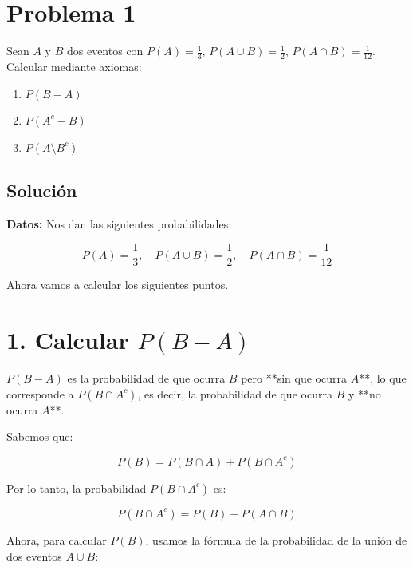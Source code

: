 \documentclass[titlepage]{article} %
\begin{document}
    \restoregeometry %

    \setcounter{page}{1}  %

    \newpage

    \Large

    \section*{\Large Problema 1}

\Large Sean $A$ y $B$ dos eventos con $P(A) = \frac{1}{3}$, $P(A \cup B) = \frac{1}{2}$, $P(A \cap B) = \frac{1}{12}$. Calcular mediante axiomas: 

\begin{enumerate}
    \item $P(B - A)$
    \item $P(A^{c} - B)$
    \item $P(A \setminus B^{c})$
\end{enumerate}

\subsection*{\Large Solución}

\Large
\textbf{Datos:}  
Nos dan las siguientes probabilidades:

\[
P(A) = \frac{1}{3}, \quad P(A \cup B) = \frac{1}{2}, \quad P(A \cap B) = \frac{1}{12}
\]

Ahora vamos a calcular los siguientes puntos.

\section*{1. Calcular \( P(B - A) \)}

\( P(B - A) \) es la probabilidad de que ocurra \( B \) pero **sin que ocurra \( A \)**, lo que corresponde a \( P(B \cap A^c) \), es decir, la probabilidad de que ocurra \( B \) y **no ocurra \( A \)**.

Sabemos que:

\[
P(B) = P(B \cap A) + P(B \cap A^c)
\]

Por lo tanto, la probabilidad \( P(B \cap A^c) \) es:

\[
P(B \cap A^c) = P(B) - P(A \cap B)
\]

Ahora, para calcular \( P(B) \), usamos la fórmula de la probabilidad de la unión de dos eventos \( A \cup B \):
\end{document}
